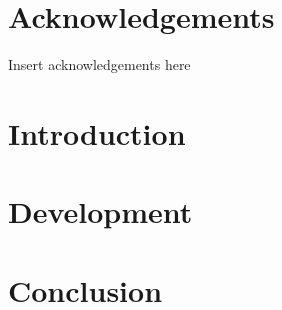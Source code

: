 \documentclass[12pt,a4paper]{article}
\begin{document}

\pagebreak

\pagebreak

\pagebreak

\begin{abstract}
\end{abstract}
\pagebreak

\tableofcontents
\newpage

\listoffigures
\newpage

\renewcommand\lstlistlistingname{List of Listings}
\lstlistoflistings{}
\newpage

\listoftables
\newpage

\section*{Acknowledgements}
Insert acknowledgements here
\subsection*{}
\newpage

\section{Introduction}



\section{Development}

\section{Conclusion}




\pagebreak

\end{document}
